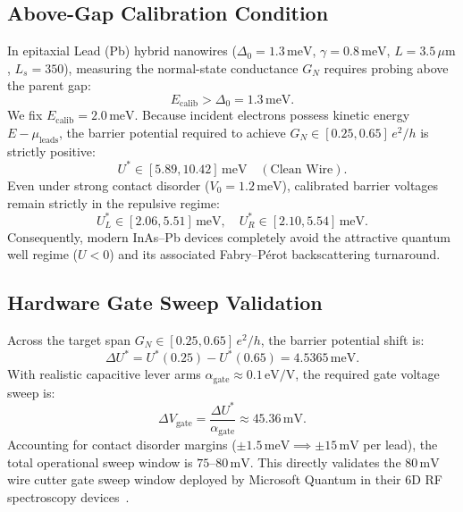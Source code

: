 \documentclass[aps,prb,reprint,superscriptaddress,showpacs,amsmath,amssymb]{revtex4-2}
\begin{document}
\subsection{Above-Gap Calibration Condition}
In epitaxial Lead (Pb) hybrid nanowires ($\Delta_0 = 1.3\,\mathrm{meV}$, $\gamma = 0.8\,\mathrm{meV}$, $L = 3.5\,\mu\mathrm{m}$, $L_s = 350$), measuring the normal-state conductance $G_N$ requires probing above the parent gap:
\begin{equation}
E_{\mathrm{calib}} > \Delta_0 = 1.3\,\mathrm{meV}.
\label{eq:lead_above_gap}
\end{equation}
We fix $E_{\mathrm{calib}} = 2.0\,\mathrm{meV}$. Because incident electrons possess kinetic energy $E - \mu_{\mathrm{leads}}$, the barrier potential required to achieve $G_N \in [0.25, 0.65]\,e^2/h$ is strictly positive:
\begin{equation}
U^* \in [5.89, 10.42]\,\mathrm{meV} \quad (\text{Clean Wire}).
\label{eq:lead_barriers}
\end{equation}
Even under strong contact disorder ($V_0 = 1.2\,\mathrm{meV}$), calibrated barrier voltages remain strictly in the repulsive regime:
\begin{equation}
U_L^* \in [2.06, 5.51]\,\mathrm{meV}, \quad U_R^* \in [2.10, 5.54]\,\mathrm{meV}.
\label{eq:lead_disordered_barriers}
\end{equation}
Consequently, modern InAs--Pb devices completely avoid the attractive quantum well regime ($U < 0$) and its associated Fabry--P\'erot backscattering turnaround.

\subsection{Hardware Gate Sweep Validation}
Across the target span $G_N \in [0.25, 0.65]\,e^2/h$, the barrier potential shift is:
\begin{equation}
\Delta U^* = U^*(0.25) - U^*(0.65) = 4.5365\,\mathrm{meV}.
\label{eq:delta_u_pb}
\end{equation}
With realistic capacitive lever arms $\alpha_{\mathrm{gate}} \approx 0.1\,\mathrm{eV/V}$, the required gate voltage sweep is:
\begin{equation}
\Delta V_{\mathrm{gate}} = \frac{\Delta U^*}{\alpha_{\mathrm{gate}}} \approx 45.36\,\mathrm{mV}.
\label{eq:delta_v_gate}
\end{equation}
Accounting for contact disorder margins ($\pm 1.5\,\mathrm{meV} \implies \pm 15\,\mathrm{mV}$ per lead), the total operational sweep window is $75\text{--}80\,\mathrm{mV}$. This directly validates the $80\,\mathrm{mV}$ wire cutter gate sweep window deployed by Microsoft Quantum in their 6D RF spectroscopy devices~\cite{Aghaee2026}.
\end{document}

